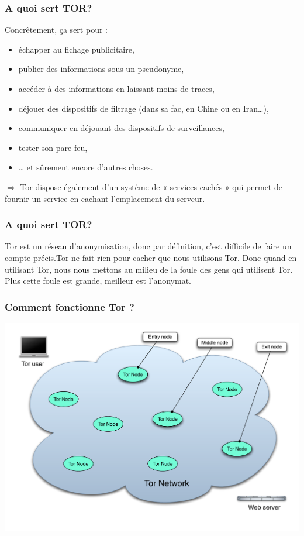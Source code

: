 \begin{frame}
\frametitle{A quoi sert TOR?}

Concrêtement, ça sert pour :
\begin{itemize}
\item  échapper au fichage publicitaire,
\item  publier des informations sous un pseudonyme,
\item  accéder à des informations en laissant moins de traces,
\item  déjouer des dispositifs de filtrage (dans sa fac, en Chine ou en Iran…),
\item  communiquer en déjouant des dispositifs de surveillances,
\item  tester son pare-feu,
\item  … et sûrement encore d'autres choses.
\end{itemize}
$\Rightarrow$ Tor dispose également d'un système de « services cachés » qui permet de fournir un service en cachant l'emplacement du serveur.
\end{frame}


\begin{frame}
\frametitle{A quoi sert TOR?}

Tor est un réseau d'anonymisation, donc par définition, c'est difficile de faire un compte
précis.Tor ne fait rien pour cacher que nous utilisons Tor. Donc quand en utilisant
Tor, nous nous mettons au milieu de la foule des gens qui utilisent Tor. Plus
cette foule est grande, meilleur est l'anonymat.
\end{frame}

\begin{frame}
\frametitle{Comment fonctionne Tor ?}
\begin{center}
\includegraphics[keepaspectratio,width=\textwidth, height=.8\textheight]{./materials/tor-safe-selection}
\end{center}
\end{frame}


